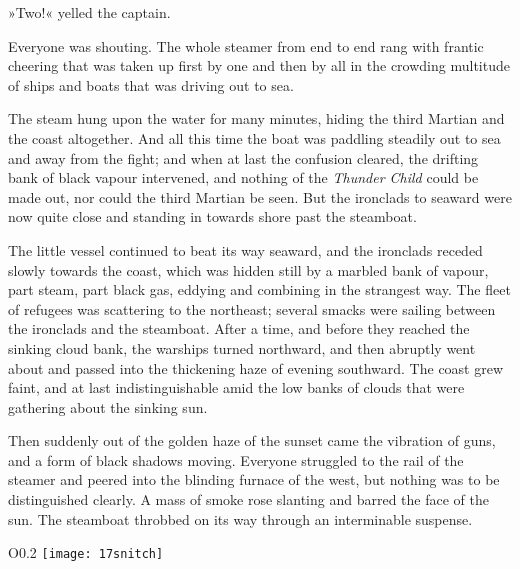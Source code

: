 »Two!« yelled the captain.

Everyone was shouting. The whole steamer from end to end rang with frantic cheering that was taken up first by one and then by all in the crowding multitude of ships and boats that was driving out to sea.

The steam hung upon the water for many minutes, hiding the third Martian and the coast altogether. And all this time the boat was paddling steadily out to sea and away from the fight; and when at last the confusion cleared, the drifting bank of black vapour intervened, and nothing of the \textit{Thunder Child} could be made out, nor could the third Martian be seen. But the ironclads to seaward were now quite close and standing in towards shore past the steamboat.

\makeatletter
{}
\makeatother

The little vessel continued to beat its way seaward, and the ironclads receded slowly towards the coast, which was hidden still by a marbled bank of vapour, part steam, part black gas, eddying and combining in the strangest way. The fleet of refugees was scattering to the northeast; several smacks were sailing between the ironclads and the steamboat. After a time, and before they reached the sinking cloud bank, the warships turned northward, and then abruptly went about and passed into the thickening haze of evening southward. The coast grew faint, and at last indistinguishable amid the low banks of clouds that were gathering about the sinking sun.



Then suddenly out of the golden haze of the sunset came the vibration of guns, and a form of black shadows moving. Everyone struggled to the rail of the steamer and peered into the blinding furnace of the west, but nothing was to be distinguished clearly. A mass of smoke rose slanting and barred the face of the sun. The steamboat throbbed on its way through an interminable suspense.
\makeatletter
{}
{%
	\begin{wrapfigure}{O}{0.2\textwidth}
	\centering
	\texttt{[image: 17snitch]}
	\end{wrapfigure}
}{%

}
\makeatother



